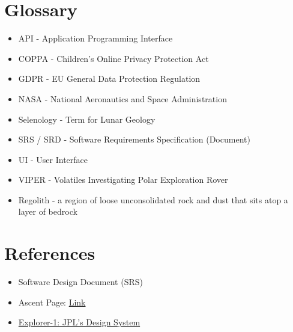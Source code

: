 \documentclass{article}
\begin{document}
\section{Glossary}
\begin{itemize}
	\item API - Application Programming Interface
	\item COPPA - Children's Online Privacy Protection Act
	\item GDPR - EU General Data Protection Regulation
	\item NASA - National Aeronautics and Space Administration
	\item Selenology - Term for Lunar Geology
	\item SRS / SRD - Software Requirements Specification (Document)
	\item UI - User Interface
	\item VIPER - Volatiles Investigating Polar Exploration Rover
	\item Regolith - a region of loose unconsolidated rock and dust that sits atop a layer of bedrock
\end{itemize}

\section{References}
\begin{itemize}
	\item Software Design Document (SRS)
	\item Ascent Page: \href{https://ascent.cysun.org/project/project/view/227}{Link}
	\item \href{https://github.com/nasa-jpl/explorer-1}{Explorer-1: JPL's Design System}
\end{itemize}
\end{document}
